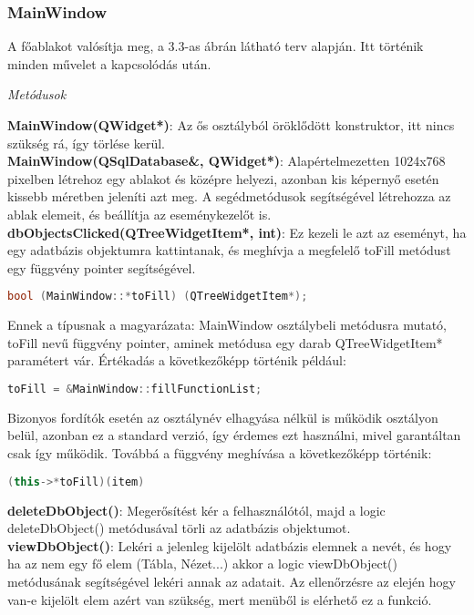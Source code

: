 \subsubsection{MainWindow}

A főablakot valósítja meg, a 3.3-as ábrán látható terv alapján. Itt történik minden művelet a kapcsolódás után.

\begin{flushleft}
\textit{Metódusok}
\end{flushleft}
\textbf{MainWindow(QWidget*)}: Az ős osztályból öröklődött konstruktor, itt nincs szükség rá, így törlése kerül. \\
\textbf{MainWindow(QSqlDatabase\&, QWidget*)}: Alapértelmezetten 1024x768 pixelben létrehoz egy ablakot és középre helyezi, azonban kis képernyő esetén kissebb méretben jeleníti azt meg. A segédmetódusok segítségével létrehozza az ablak elemeit, és beállítja az eseménykezelőt is. \\
\textbf{dbObjectsClicked(QTreeWidgetItem*, int)}: Ez kezeli le azt az eseményt, ha egy adatbázis objektumra kattintanak, és meghívja a megfelelő toFill metódust egy függvény pointer segítségével.
\begin{lstlisting}[language=C++]
bool (MainWindow::*toFill) (QTreeWidgetItem*);
\end{lstlisting}
Ennek a típusnak a magyarázata: MainWindow osztálybeli metódusra mutató, toFill nevű függvény pointer, aminek metódusa egy darab QTreeWidgetItem* paramétert vár. Értékadás a következőképp történik például:
\begin{lstlisting}[language=C++]
toFill = &MainWindow::fillFunctionList;
\end{lstlisting}
Bizonyos fordítók esetén az osztálynév elhagyása nélkül is működik osztályon belül, azonban ez a standard verzió, így érdemes ezt használni, mivel garantáltan csak így működik. Továbbá a függvény meghívása a következőképp történik:
\begin{lstlisting}[language=C++]
(this->*toFill)(item)
\end{lstlisting}
\textbf{deleteDbObject()}: Megerősítést kér a felhasználótól, majd a logic deleteDbObject() metódusával törli az adatbázis objektumot. \\
\textbf{viewDbObject()}: Lekéri a jelenleg kijelölt adatbázis elemnek a nevét, és hogy ha az nem egy fő elem (Tábla, Nézet...) akkor a logic viewDbObject() metódusának segítségével lekéri annak az adatait. Az ellenőrzésre az elején hogy van-e kijelölt elem azért van szükség, mert menüből is elérhető ez a funkció. \\
